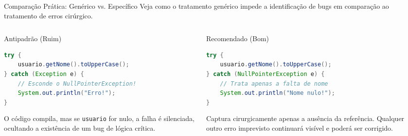 \documentclass[9pt]{beamer}
\begin{document}
\begin{frame}[fragile]{Comparação Prática: Genérico vs. Específico}
    Veja como o tratamento genérico impede a identificação de bugs em comparação ao tratamento de erros cirúrgico.
    
    \vspace{0.2cm}
    
    \begin{columns}[t]
        \begin{column}{0.48\textwidth}
            \begin{block}{Antipadrão (Ruim)}
                \begin{lstlisting}[language=Java,numbers=none]
try {
    usuario.getNome().toUpperCase();
} catch (Exception e) {
    // Esconde o NullPointerException!
    System.out.println("Erro!");
}
\end{lstlisting}
                \vspace{0.15cm}
                \scriptsize
                O código compila, mas se \texttt{usuario} for nulo, a falha é silenciada, ocultando a existência de um bug de lógica crítica.
            \end{block}
        \end{column}
        
        \begin{column}{0.48\textwidth}
            \begin{block}{Recomendado (Bom)}
                \begin{lstlisting}[language=Java,numbers=none]
try {
    usuario.getNome().toUpperCase();
} catch (NullPointerException e) {
    // Trata apenas a falta de nome
    System.out.println("Nome nulo!");
}
\end{lstlisting}
                \vspace{0.15cm}
                \scriptsize
                Captura cirurgicamente apenas a ausência da referência. Qualquer outro erro imprevisto continuará visível e poderá ser corrigido.
            \end{block}
        \end{column}
    \end{columns}
\end{frame}
\end{document}
